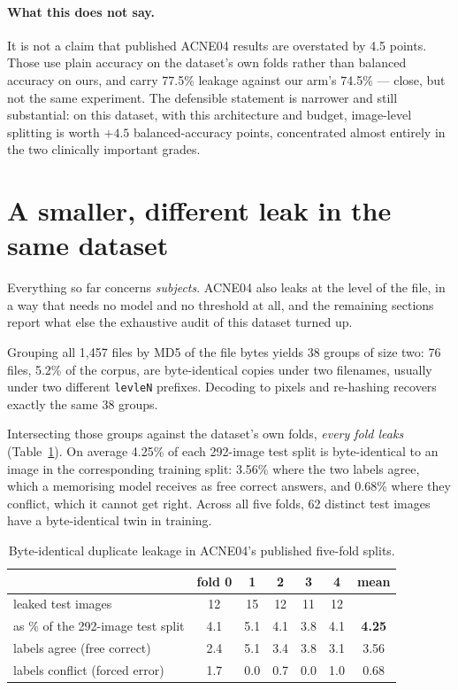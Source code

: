 \documentclass[11pt]{article}
\begin{document}
\paragraph{What this does not say.}
It is not a claim that published ACNE04 results are overstated by 4.5 points. Those use
plain accuracy on the dataset's own folds rather than balanced accuracy on ours, and carry
77.5\% leakage against our arm's 74.5\% --- close, but not the same experiment. The
defensible statement is narrower and still substantial: on this dataset, with this
architecture and budget, image-level splitting is worth $+4.5$ balanced-accuracy points,
concentrated almost entirely in the two clinically important grades.

\section{A smaller, different leak in the same dataset}
\label{sec:duplicates}

Everything so far concerns \emph{subjects}. ACNE04 also leaks at the level of the file, in
a way that needs no model and no threshold at all, and the remaining sections report what
else the exhaustive audit of this dataset turned up.

Grouping all 1{,}457 files by MD5 of the file bytes yields 38 groups of size two: 76
files, 5.2\% of the corpus, are byte-identical copies under two filenames, usually under
two different \texttt{levleN} prefixes. Decoding to pixels and re-hashing recovers
exactly the same 38 groups.

Intersecting those groups against the dataset's own folds, \emph{every fold leaks}
(Table~\ref{tab:folds}). On average 4.25\% of each 292-image test split is byte-identical
to an image in the corresponding training split: 3.56\% where the two labels agree,
which a memorising model receives as free correct answers, and 0.68\% where they
conflict, which it cannot get right. Across all five folds, 62 distinct test images have
a byte-identical twin in training.

\begin{table}[t]
\centering
\begin{tabular}{lccccc c}
\toprule
& fold 0 & 1 & 2 & 3 & 4 & mean \\
\midrule
leaked test images & 12 & 15 & 12 & 11 & 12 & \\
as \% of the 292-image test split & 4.1 & 5.1 & 4.1 & 3.8 & 4.1 & \textbf{4.25} \\
\quad labels agree (free correct) & 2.4 & 5.1 & 3.4 & 3.8 & 3.1 & 3.56 \\
\quad labels conflict (forced error) & 1.7 & 0.0 & 0.7 & 0.0 & 1.0 & 0.68 \\
\bottomrule
\end{tabular}
\caption{Byte-identical duplicate leakage in ACNE04's published five-fold splits.}
\label{tab:folds}
\end{table}
\end{document}
